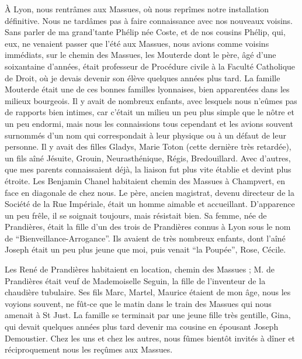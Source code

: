 \documentclass[11pt,a4paper]{report}
\begin{document}
À Lyon, nous rentrâmes aux Massues, où nous reprîmes notre installation définitive. Nous ne tardâmes pas à faire connaissance avec nos nouveaux voisins. Sans parler de ma grand'tante Phélip née Coste, et de nos cousins Phélip, qui, eux, ne venaient passer que l'été aux Massues, nous avions comme voisins immédiats, sur le chemin des Massues, les Mouterde dont le père, âgé d'une soixantaine d'années, était professeur de Procédure civile à la Faculté Catholique de Droit, où je devais devenir son élève quelques années plus tard. La famille Mouterde était une de ces bonnes familles lyonnaises, bien apparentées dans les milieux bourgeois. Il y avait de nombreux enfants, avec lesquels nous n'eûmes pas de rapports bien intimes, car c'était un milieu un peu plus simple que le nôtre et un peu endormi, mais nous les connaissions tous cependant et les avions souvent surnommés d'un nom qui correspondait à leur physique ou à un défaut de leur personne. Il y avait des filles Gladys, Marie Toton (cette dernière très retardée), un fils aîné Jésuite, Grouin, Neurasthénique, Régis, Bredouillard. Avec d'autres, que mes parents connaissaient déjà, la liaison fut plus vite établie et devint plus étroite. Les Benjamin Chanel habitaient chemin des Massues à Champvert, en face en diagonale de chez nous. Le père, ancien magistrat, devenu directeur de la Société de la Rue Impériale, était un homme aimable et accueillant. D'apparence un peu frêle, il se soignait toujours, mais résistait bien. Sa femme, née de Prandières, était la fille d'un des trois de Prandières connus à Lyon sous le nom de ``Bienveillance-Arrogance''. Ils avaient de très nombreux enfants, dont l'aîné Joseph était un peu plus jeune que moi, puis venait ``la Poupée'', Rose, Cécile.

Les René de Prandières habitaient en location, chemin des Massues ; M. de Prandières était veuf de Mademoiselle Seguin, la fille de l'inventeur de la chaudière tubulaire. Ses fils Marc, Martel, Maurice étaient de mon âge, nous les voyions souvent, ne fût-ce que le matin dans le train des Massues qui nous amenait à St Just. La famille se terminait par une jeune fille très gentille, Gina, qui devait quelques années plus tard devenir ma cousine en épousant Joseph Demoustier. Chez les uns et chez les autres, nous fûmes bientôt invités à dîner et réciproquement nous les reçûmes aux Massues.
\end{document}
